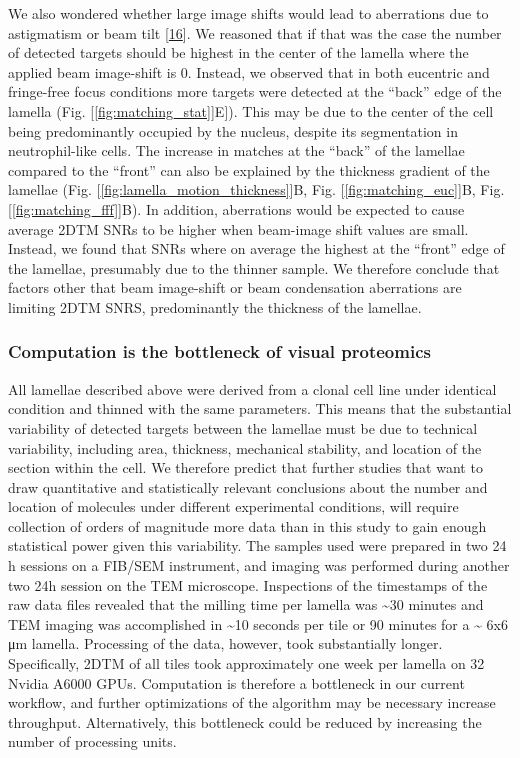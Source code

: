 \documentclass[
]{article}
\begin{document}
We also wondered whether large image shifts would lead to aberrations
due to astigmatism or beam tilt {[}\protect\hyperlink{ref-APSL9LmU}{16}{]}. We
reasoned that if that was the case the number of detected targets should
be highest in the center of the lamella where the applied beam
image-shift is 0. Instead, we observed that in both eucentric and
fringe-free focus conditions more targets were detected at the ``back''
edge of the lamella (Fig. {[}\ref{fig:matching_stat}{]}E{]}). This may be due to
the center of the cell being predominantly occupied by the nucleus,
despite its segmentation in neutrophil-like cells. The increase in
matches at the ``back'' of the lamellae compared to the ``front'' can also
be explained by the thickness gradient of the lamellae (Fig.
{[}\ref{fig:lamella_motion_thickness}{]}B, Fig. {[}\ref{fig:matching_euc}{]}B, Fig.
{[}\ref{fig:matching_fff}{]}B). In addition, aberrations would be expected to
cause average 2DTM SNRs to be higher when beam-image shift values are
small. Instead, we found that SNRs where on average the highest at the
``front'' edge of the lamellae, presumably due to the thinner sample. We
therefore conclude that factors other that beam image-shift or beam
condensation aberrations are limiting 2DTM SNRS, predominantly the
thickness of the lamellae.

\hypertarget{computation-is-the-bottleneck-of-visual-proteomics}{%
\subsubsection{Computation is the bottleneck of visual proteomics}\label{computation-is-the-bottleneck-of-visual-proteomics}}

All lamellae described above were derived from a clonal cell line under
identical condition and thinned with the same parameters. This means
that the substantial variability of detected targets between the
lamellae must be due to technical variability, including area,
thickness, mechanical stability, and location of the section within the
cell. We therefore predict that further studies that want to draw
quantitative and statistically relevant conclusions about the number and
location of molecules under different experimental conditions, will
require collection of orders of magnitude more data than in this study
to gain enough statistical power given this variability. The samples
used were prepared in two 24 h sessions on a FIB/SEM instrument, and
imaging was performed during another two 24h session on the TEM
microscope. Inspections of the timestamps of the raw data files revealed
that the milling time per lamella was \textasciitilde30 minutes and TEM imaging was
accomplished in \textasciitilde10 seconds per tile or 90 minutes for a \textasciitilde{} 6x6 μm
lamella. Processing of the data, however, took substantially longer.
Specifically, 2DTM of all tiles took approximately one week per lamella
on 32 Nvidia A6000 GPUs. Computation is therefore a bottleneck in our
current workflow, and further optimizations of the algorithm may be
necessary increase throughput. Alternatively, this bottleneck could be
reduced by increasing the number of processing units.
\end{document}
